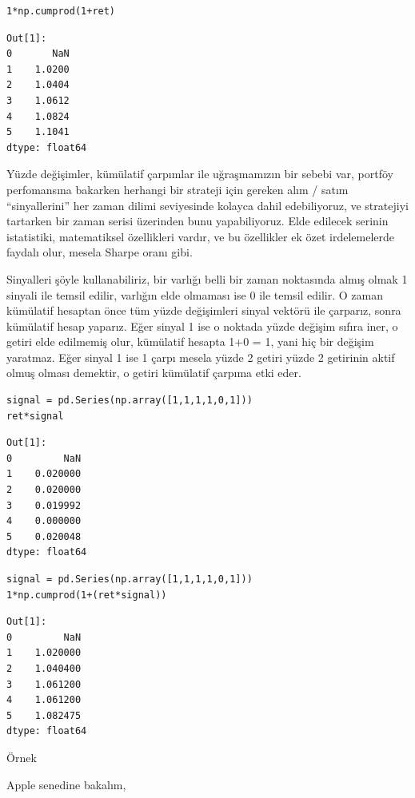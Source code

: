 \documentclass[12pt,fleqn]{article}\usepackage{../../common}
\begin{document}
\begin{verbatim}
1*np.cumprod(1+ret)
\end{verbatim}

\begin{verbatim}
Out[1]: 
0       NaN
1    1.0200
2    1.0404
3    1.0612
4    1.0824
5    1.1041
dtype: float64
\end{verbatim}

Yüzde değişimler, kümülatif çarpımlar ile uğraşmamızın bir sebebi var, portföy
perfomansına bakarken herhangi bir strateji için gereken alım / satım
``sinyallerini'' her zaman dilimi seviyesinde kolayca dahil edebiliyoruz, ve
stratejiyi tartarken bir zaman serisi üzerinden bunu yapabiliyoruz. Elde
edilecek serinin istatistiki, matematiksel özellikleri vardır, ve bu özellikler
ek özet irdelemelerde faydalı olur, mesela Sharpe oranı gibi.

Sinyalleri şöyle kullanabiliriz, bir varlığı belli bir zaman noktasında almış
olmak 1 sinyali ile temsil edilir, varlığın elde olmaması ise 0 ile temsil
edilir.  O zaman kümülatif hesaptan önce tüm yüzde değişimleri sinyal vektörü
ile çarparız, sonra kümülatif hesap yaparız. Eğer sinyal 1 ise o noktada yüzde
değişim sıfıra iner, o getiri elde edilmemiş olur, kümülatif hesapta 1+0 = 1,
yani hiç bir değişim yaratmaz. Eğer sinyal 1 ise 1 çarpı mesela yüzde 2 getiri
yüzde 2 getirinin aktif olmuş olması demektir, o getiri kümülatif çarpıma etki
eder.

\begin{verbatim}
signal = pd.Series(np.array([1,1,1,1,0,1]))
ret*signal
\end{verbatim}

\begin{verbatim}
Out[1]: 
0         NaN
1    0.020000
2    0.020000
3    0.019992
4    0.000000
5    0.020048
dtype: float64
\end{verbatim}

\begin{verbatim}
signal = pd.Series(np.array([1,1,1,1,0,1]))
1*np.cumprod(1+(ret*signal))
\end{verbatim}

\begin{verbatim}
Out[1]: 
0         NaN
1    1.020000
2    1.040400
3    1.061200
4    1.061200
5    1.082475
dtype: float64
\end{verbatim}

Örnek

Apple senedine bakalım,
\end{document}
